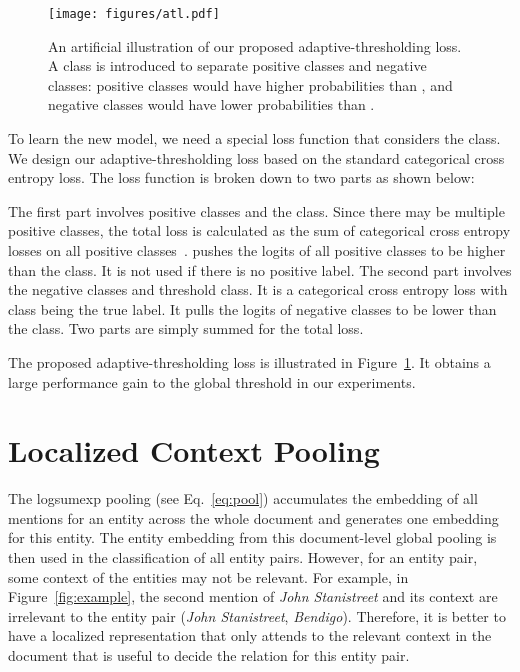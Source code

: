 \documentclass[letterpaper]{article}
\begin{document}
\begin{figure}[!t]
    \centering
    \texttt{[image: figures/atl.pdf]}
    \caption{An artificial illustration of our proposed adaptive-thresholding loss. A  class is introduced to separate positive classes and negative classes: positive classes would have higher probabilities than , and negative classes would have lower probabilities than .} 
    \label{fig:atl}
\end{figure}
To learn the new model, we need a special loss function that considers the  class.
We design our adaptive-thresholding loss based on the standard categorical cross entropy loss.
The loss function is broken down to two parts as shown below:

The first part  involves positive classes and the  class.
Since there may be multiple positive classes, the total loss is calculated as the sum of categorical cross entropy losses on all positive classes~\cite{Menon2019MultilabelRW,Reddi2019StochasticNM}.
 pushes the logits of all positive classes to be higher than the  class.
It is not used if there is no positive label.
The second part  involves the negative classes and threshold class.
It is a categorical cross entropy loss with  class being the true label.
It pulls the logits of negative classes to be lower than the  class.
Two parts are simply summed for the total loss.

The proposed adaptive-thresholding loss is illustrated in Figure~\ref{fig:atl}.
It obtains a large performance gain to the global threshold in our experiments.

\section{Localized Context Pooling}
The logsumexp pooling (see Eq.~\eqref{eq:pool}) accumulates the embedding of all mentions for an entity across the whole document and generates one embedding for this entity.
The entity embedding from this document-level global pooling is then used in the classification of all entity pairs. However, for an entity pair, some context of the entities may not be relevant.
For example, in Figure~\ref{fig:example}, the second mention of \textit{John Stanistreet} and its context are irrelevant to the entity pair (\textit{John Stanistreet}, \textit{Bendigo}).
Therefore, it is better to have a localized representation that only attends to the relevant context in the document that is useful to decide the relation for this entity pair.
\end{document}
